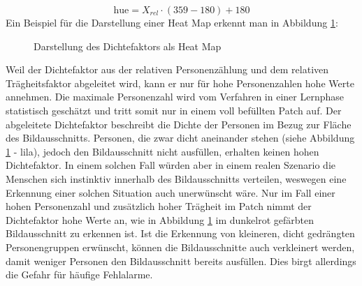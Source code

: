 \begin{equation}
    \text{hue} = X_{rel}\cdot(359-180) + 180
\end{equation}
\vskip 10pt
Ein Beispiel für die Darstellung einer Heat Map erkennt man in Abbildung \ref{heatmap}:
\vskip 10pt
\begin{figure}[h]
  \centering
  \caption{Darstellung des Dichtefaktors als Heat Map \cite{CourtyPRL2014} \cite{Allain2012ICPR}}
  \label{heatmap}
\end{figure}

Weil der Dichtefaktor aus der relativen Personenzählung und dem relativen Trägheitsfaktor abgeleitet wird, kann er nur für hohe Personenzahlen hohe Werte annehmen. Die maximale Personenzahl wird vom Verfahren in einer Lernphase statistisch geschätzt und tritt somit nur in einem voll befüllten Patch auf. Der abgeleitete Dichtefaktor beschreibt die Dichte der Personen im Bezug zur Fläche des Bildausschnitts. Personen, die zwar dicht aneinander stehen (siehe Abbildung \ref{heatmap} - lila), jedoch den Bildausschnitt nicht ausfüllen, erhalten keinen hohen Dichtefaktor. In einem solchen Fall würden aber in einem realen Szenario die Menschen sich instinktiv innerhalb des Bildausschnitts verteilen, weswegen eine Erkennung einer solchen Situation auch unerwünscht wäre.
\newpage
Nur im Fall einer hohen Personenzahl und zusätzlich hoher Trägheit im Patch nimmt der Dichtefaktor hohe Werte an, wie in Abbildung \ref{heatmap} im dunkelrot gefärbten Bildausschnitt zu erkennen ist. Ist die Erkennung von kleineren, dicht gedrängten Personengruppen erwünscht, können die Bildausschnitte auch verkleinert werden, damit weniger Personen den Bildausschnitt bereits ausfüllen. Dies birgt allerdings die Gefahr für häufige Fehlalarme.

